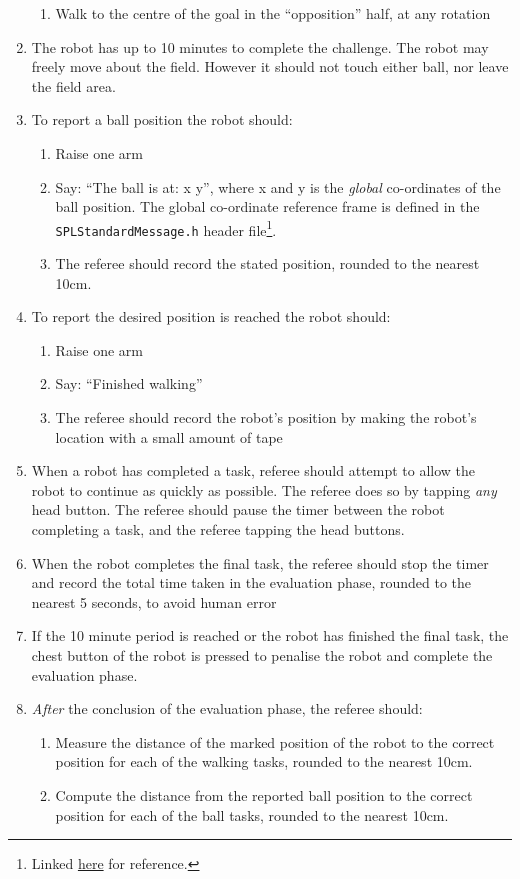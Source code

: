 \begin{enumerate}
\begin{enumerate}
        \item Walk to the centre of the goal in the ``opposition'' half, at any rotation
    \end{enumerate}
    \item The robot has up to 10 minutes to complete the challenge. The robot may freely move about the field. However it should not touch either ball, nor leave the field area.
    \item To report a ball position the robot should:
    \begin{enumerate}
        \item Raise one arm
        \item Say: ``The ball is at: x y'', where x and y is the \textit{global} co-ordinates of the ball position. The global co-ordinate reference frame is defined in the \texttt{SPLStandardMessage.h} header file\footnote{Linked \href{https://github.com/bhuman/GameController/blob/master/include/SPLStandardMessage.h}{here} for reference.}.
        \item The referee should record the stated position, rounded to the nearest 10cm.
    \end{enumerate}
    \item To report the desired position is reached the robot should:
    \begin{enumerate}
        \item Raise one arm
        \item Say: ``Finished walking''
        \item The referee should record the robot's position by making the robot's location with a small amount of tape
    \end{enumerate}
    \item When a robot has completed a task, referee should attempt to allow the robot to continue as quickly as possible. The referee does so by tapping \textit{any} head button. The referee should pause the timer between the robot completing a task, and the referee tapping the head buttons.
    \item When the robot completes the final task, the referee should stop the timer and record the total time taken in the evaluation phase, rounded to the nearest 5 seconds, to avoid human error 
    \item If the 10 minute period is reached or the robot has finished the final task, the chest button of the robot is pressed to penalise the robot and complete the evaluation phase.
    \item \textit{After} the conclusion of the evaluation phase, the referee should:
    \begin{enumerate}
        \item Measure the distance of the marked position of the robot to the correct position for each of the walking tasks, rounded to the nearest 10cm.
        \item Compute the distance from the reported ball position to the correct position for each of the ball tasks, rounded to the nearest 10cm.
    \end{enumerate}  
\end{enumerate} 

